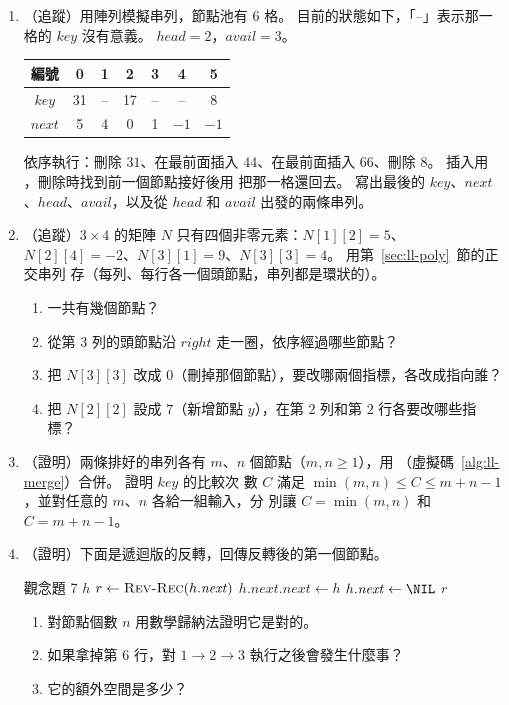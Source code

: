 \begin{enumerate}
\item （追蹤）用陣列模擬串列，節點池有 $6$ 格。 目前的狀態如下，「--」表示那一格的
$\mathit{key}$ 沒有意義。 $\mathit{head} = 2$，$\mathit{avail} = 3$。
\begin{center}
\begin{tabular}{ccccccc}
\toprule
編號 & 0 & 1 & 2 & 3 & 4 & 5 \\
\midrule
$\mathit{key}$ & 31 & -- & 17 & -- & -- & 8 \\
$\mathit{next}$ & 5 & 4 & 0 & 1 & $-1$ & $-1$ \\
\bottomrule
\end{tabular}
\end{center}
依序執行：刪除 $31$、在最前面插入 $44$、在最前面插入 $66$、刪除 $8$。 插入用
，刪除時找到前一個節點接好後用  把那一格還回去。 寫出最後的
$\mathit{key}$、$\mathit{next}$、$\mathit{head}$、$\mathit{avail}$，以及從
$\mathit{head}$ 和 $\mathit{avail}$ 出發的兩條串列。

\item （追蹤）$3 \times 4$ 的矩陣 $N$ 只有四個非零元素：$N[1][2] = 5$、
$N[2][4] = -2$、$N[3][1] = 9$、$N[3][3] = 4$。 用第~\ref{sec:ll-poly}~節的正交串列
存（每列、每行各一個頭節點，串列都是環狀的）。
\begin{enumerate}
\item 一共有幾個節點？
\item 從第 $3$ 列的頭節點沿 $\mathit{right}$ 走一圈，依序經過哪些節點？
\item 把 $N[3][3]$ 改成 $0$（刪掉那個節點），要改哪兩個指標，各改成指向誰？
\item 把 $N[2][2]$ 設成 $7$（新增節點 $y$），在第 $2$ 列和第 $2$ 行各要改哪些指標？
\end{enumerate}

\item （證明）兩條排好的串列各有 $m$、$n$ 個節點（$m, n \ge 1$），用
（虛擬碼~\ref{alg:ll-merge}）合併。 證明 $\mathit{key}$ 的比較次
數 $C$ 滿足 $\min(m, n) \le C \le m + n - 1$，並對任意的 $m$、$n$ 各給一組輸入，分
別讓 $C = \min(m, n)$ 和 $C = m + n - 1$。

\item （證明）下面是遞迴版的反轉，回傳反轉後的第一個節點。
\begin{pseudo}{觀念題 7}
        \State \Return $h$
    \EndIf
    \State $r \gets \Call{Rev-Rec}{h.\mathit{next}}$
    \State $h.\mathit{next}.\mathit{next} \gets h$
    \State $h.\mathit{next} \gets \NIL$
    \State \Return $r$
\EndFunction
\end{pseudo}
\begin{enumerate}
\item 對節點個數 $n$ 用數學歸納法證明它是對的。
\item 如果拿掉第 6 行，對 $1 \to 2 \to 3$ 執行之後會發生什麼事？
\item 它的額外空間是多少？
\end{enumerate}


\end{enumerate}
